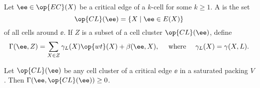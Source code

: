 \begin{definition}\label{def:gammaL} 
Let $\ee\in \op{EC}(X)$ be a critical edge of a $k$-cell for some $k\ge 1$.
A  is the set 
\begin{displaymath} 
\op{CL}(\ee) = \{X\mid \ee\in E(X)\} 
\end{displaymath}
%
of all cells around $\ee$. 
If $Z$ is a subset of a cell cluster $\op{CL}(\ee)$, define
%
%
\begin{displaymath} 
\Gamma(\ee,Z) = \sum_{X\in Z} \gamma_L(X) \op{wt}(X) +\beta(\ee,X),\quad\hbox{ where }\quad
\gamma_L(X) = \gamma(X,L).
\end{displaymath}
%
%

\end{definition}
%

\begin{theorem} 
\label{lemma:cluster}
Let $\op{CL}(\ee)$ be any cell cluster of a critical edge $\ee$ in a saturated packing $V$.  
Then $\Gamma(\ee,\op{CL}(\ee))\ge 0$.
\end{theorem}


